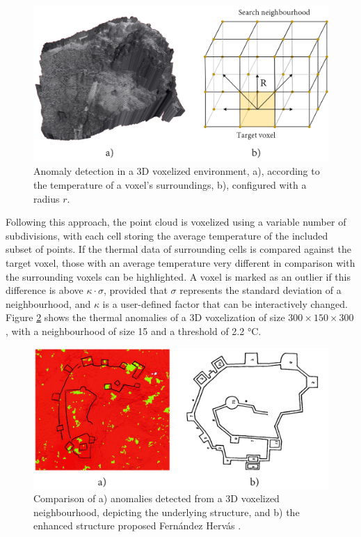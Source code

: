 \begin{figure}[ht]
    \centering
    \includegraphics[width=\linewidth]{figs/castle_puerta_arenas/voxel_anomalies.png}
	\caption{Anomaly detection in a 3D voxelized environment, a), according to the temperature of a voxel's surroundings, b), configured with a radius $r$.}
	\label{fig:voxel_anomalies_scheme}
\end{figure}

Following this approach, the point cloud is voxelized using a variable number of subdivisions, with each cell storing the average temperature of the included subset of points. If the thermal data of surrounding cells is compared against the target voxel, those with an average temperature very different in comparison with the surrounding voxels can be highlighted. A voxel is marked as an outlier if this difference is above $\kappa \cdot \sigma$, provided that $\sigma$ represents the standard deviation of a neighbourhood, and $\kappa$ is a user-defined factor that can be interactively changed. Figure \ref{fig:voxel_anomalies} shows the thermal anomalies of a 3D voxelization of size $300 \times 150 \times 300$, with a neighbourhood of size 15 and a threshold of 2.2 \si{\celsius}.

\begin{figure}[ht]
    \centering
    \includegraphics[width=\linewidth]{figs/castle_puerta_arenas/voxel_anomalies_highlighted.png}
	\caption{Comparison of a) anomalies detected from a 3D voxelized neighbourhood, depicting the underlying structure, and b) the enhanced structure proposed Fernández Hervás \cite{fernandez_hervas_castillo_1986}.}
	\label{fig:voxel_anomalies}
\end{figure}

